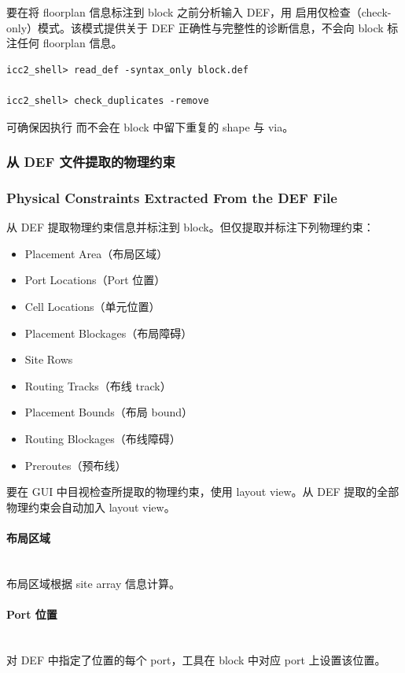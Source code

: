 要在将 floorplan 信息标注到 block 之前分析输入 DEF，用  启用仅检查（check-only）模式。该模式提供关于 DEF 正确性与完整性的诊断信息，不会向 block 标注任何 floorplan 信息。
\begin{lstlisting}
icc2_shell> read_def -syntax_only block.def

icc2_shell> check_duplicates -remove
\end{lstlisting}

 可确保因执行  而不会在 block 中留下重复的 shape 与 via。

\subsubsection{从 DEF 文件提取的物理约束}
\subsubsection*{Physical Constraints Extracted From the DEF File}

 从 DEF 提取物理约束信息并标注到 block。但仅提取并标注下列物理约束：
\begin{itemize}
  \item Placement Area（布局区域）
  \item Port Locations（Port 位置）
  \item Cell Locations（单元位置）
  \item Placement Blockages（布局障碍）
  \item Site Rows
  \item Routing Tracks（布线 track）
  \item Placement Bounds（布局 bound）
  \item Routing Blockages（布线障碍）
  \item Preroutes（预布线）
\end{itemize}

要在 GUI 中目视检查所提取的物理约束，使用 layout view。从 DEF 提取的全部物理约束会自动加入 layout view。

\paragraph{布局区域}\mbox{}\\
布局区域根据 site array 信息计算。

\paragraph{Port 位置}\mbox{}\\
对 DEF 中指定了位置的每个 port，工具在 block 中对应 port 上设置该位置。

